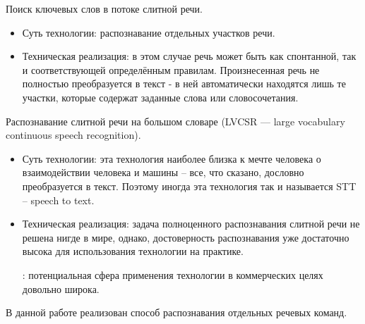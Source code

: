 \documentclass[14pt,russian,utf8,nocolumnsxix]{extarticle}
\begin{document}
Поиск ключевых слов в потоке слитной речи.
\begin{itemize}
\item Суть технологии: распознавание отдельных участков речи.

\item Техническая реализация: в этом случае речь может быть как спонтанной, так и соответствующей определённым правилам. Произнесенная речь не полностью преобразуется в текст - в ней автоматически находятся лишь те участки, которые содержат заданные слова или словосочетания.
\end{itemize}

Распознавание слитной речи на большом словаре (LVCSR — large vocabulary continuous speech recognition).
\begin{itemize}
\item Суть технологии: эта технология наиболее близка к мечте человека о взаимодействии человека и машины – все, что сказано, дословно преобразуется в текст. Поэтому иногда эта технология так и называется STT – speech to text.

\item Техническая реализация: задача полноценного распознавания слитной речи не решена нигде в мире, однако, достоверность распознавания уже достаточно высока для использования технологии на практике.

: потенциальная сфера применения технологии в коммерческих целях довольно широка.
\end{itemize}

В данной работе реализован способ распознавания отдельных речевых команд.
\end{document}
